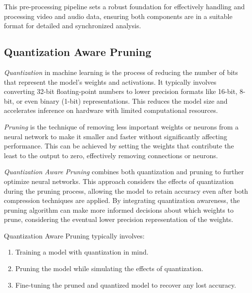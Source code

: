 \documentclass{ioereport}
\begin{document}
    This pre-processing pipeline sets a robust foundation for effectively handling and processing video and audio data, ensuring both components are in a suitable format for detailed and synchronized analysis.

    \subsection{Quantization Aware Pruning}
    \textit{Quantization} in machine learning is the process of reducing the number of bits that represent the model's weights and activations. It typically involves converting 32-bit floating-point numbers to lower precision formats like 16-bit, 8-bit, or even binary (1-bit) representations. This reduces the model size and accelerates inference on hardware with limited computational resources.

    \textit{Pruning} is the technique of removing less important weights or neurons from a neural network to make it smaller and faster without significantly affecting performance. This can be achieved by setting the weights that contribute the least to the output to zero, effectively removing connections or neurons.

    \textit{Quantization Aware Pruning} combines both quantization and pruning to further optimize neural networks. This approach considers the effects of quantization during the pruning process, allowing the model to retain accuracy even after both compression techniques are applied. By integrating quantization awareness, the pruning algorithm can make more informed decisions about which weights to prune, considering the eventual lower precision representation of the weights.

    Quantization Aware Pruning typically involves:
    \begin{enumerate}[label=\textbf{\roman*.}]
        \item Training a model with quantization in mind.
        \item Pruning the model while simulating the effects of quantization.
        \item Fine-tuning the pruned and quantized model to recover any lost accuracy.
    \end{enumerate}
\end{document}
